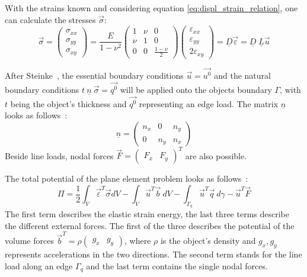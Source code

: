   With the strains known and considering equation \eqref{eq:displ_strain_relation}, one can calculate the stresses $\vec{\sigma}$:
  \begin{equation}\label{eq:sigma=D*eps}
  \vec{\sigma} = \begin{pmatrix}
  \sigma_{xx} \\
  \sigma_{yy} \\
  \sigma_{xy}
  \end{pmatrix} = \frac{E}{1-\nu^2} \begin{pmatrix}
  1 & \nu & 0 \\
  \nu & 1 & 0 \\
  0 & 0 & \frac{1-\nu}{2}
  \end{pmatrix} \begin{pmatrix}
  \varepsilon_{xx} \\
  \varepsilon_{yy} \\
  2\varepsilon_{xy}
  \end{pmatrix} = \underline{D} \vec{\varepsilon} = \underline{D}\; \underline{L} \vec{u}
  \end{equation}

  After Steinke~\cite{steinke2005finite}, the essential boundary conditions $\vec{u} = \vec{u^0}$ and the natural boundary conditions $t\ \underline{n}\ \vec{\sigma} = \vec{q^0}$ will be applied onto the objects boundary $\Gamma$, with $t$ being the object's thickness and $\vec{q^0}$ representing an edge load. The matrix $\underline{n}$ looks as follows~\cite{steinke2005finite}:
  \begin{equation}
  \underline{n} = \begin{pmatrix}
  n_x & 0 & n_y\\ 0 & n_y & n_x
  \end{pmatrix}
  \end{equation}
  Beside line loads, nodal forces $\vec{F} = \begin{pmatrix}
  F_x & F_y
  \end{pmatrix}^T$ are also possible.
  
  The total potential of the plane element problem looks as follows~\cite{steinke2005finite}:
  \begin{equation}
  \Pi = \frac{1}{2} \int_{V}\vec{\varepsilon}^T\vec{\sigma}dV - \int_{V} \vec{u}^T \vec{b}\ dV - \int_{\Gamma_q}\vec{u}^T \vec{q}\ d\gamma -\vec{u}^T \vec{F}
  \end{equation}
  The first term describes the elastic strain energy, the last three terms describe the different external forces. The first of the three describes the potential of the volume forces $\vec{b}^T = \rho \begin{pmatrix}
  g_x & g_y
  \end{pmatrix}$, where $\rho$ is the object's density and $g_x, g_y$ represents accelerations in the two directions. The second term stands for the line load along an edge $\Gamma_q$ and the last term contains the single nodal forces.
  
